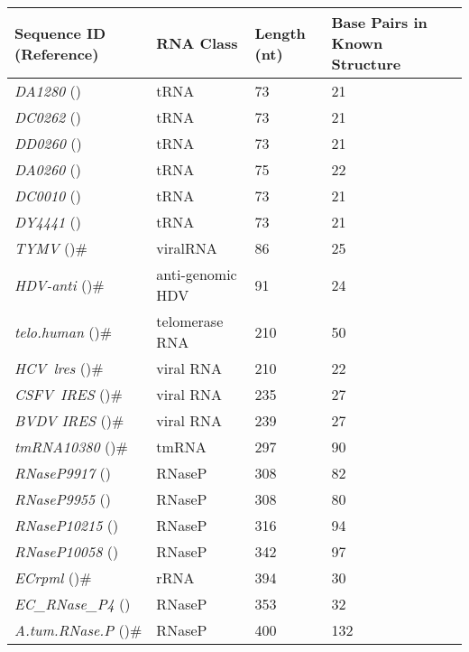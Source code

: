 \documentclass{doublecol-new}
\theoremstyle{TH}{
\newtheorem{lemma}{Lemma}
\newtheorem{theorem}[lemma]{Theorem}
\newtheorem{corrolary}[lemma]{Corrolary}
\newtheorem{conjecture}[lemma]{Conjecture}
\newtheorem{proposition}[lemma]{Proposition}
\newtheorem{claim}[lemma]{Claim}
\newtheorem{stheorem}[lemma]{Wrong Theorem}
\newtheorem{algorithm}{Algorithm}
}
\theoremstyle{THrm}{
\newtheorem{definition}{Definition}
\newtheorem{question}{Question}
\newtheorem{remark}{Remark}
\newtheorem{scheme}{Scheme}
}
\theoremstyle{THhit}{
\newtheorem{case}{Case}[section]
}
\begin{document}
\begin{table}[h]
\begin{tabular}{p{1.1in} p{0.8in} p{0.3in} p{0.3in}}
        \hline
        \textbf{Sequence ID (Reference)}   & \textbf{RNA Class}   & \textbf{Length (nt)} & \textbf{Base Pairs in Known Structure}\\
        \hline
        \hline
        \textit{DA1280} (\cite{sprinzl_1998}) & tRNA & 73 & 21 \\
        \textit{DC0262} (\cite{sprinzl_1998}) & tRNA & 73 & 21 \\
        \textit{DD0260} (\cite{sprinzl_1998}) & tRNA & 73 & 21 \\
        \textit{DA0260} (\cite{sprinzl_1998})  & tRNA & 75 & 22\\
        \textit{DC0010} (\cite{sprinzl_1998})  & tRNA & 73 & 21\\
        \textit{DY4441} (\cite{sprinzl_1998})  & tRNA & 73 & 21\\
        \textit{TYMV} (\cite{deima_1997})\#  & viralRNA & 86 & 25\\
        \textit{HDV-anti} (\cite{ferre_1998})\#  & anti-genomic HDV & 91 & 24\\
        \hline
        \textit{telo.human} (\cite{chen_2000})\#  & telomerase RNA & 210 & 50\\
        \textit{HCV~lres} (\cite{belkum_1985})\#  & viral RNA & 210 & 22\\
        \textit{CSFV~IRES} (\cite{belkum_1985})\#  & viral RNA & 235 & 27\\
        \textit{BVDV IRES} (\cite{belkum_1985})\#  & viral RNA & 239 & 27\\
        \textit{tmRNA10380} (\cite{DBLP:journals/nar/BatenburgGP01})\#  & tmRNA & 297 & 90\\
        \textit{RNaseP9917} (\cite{brown_1997})  & RNaseP & 308 & 82\\
        \textit{RNaseP9955} (\cite{brown_1997})  & RNaseP & 308 & 80\\
        \textit{RNaseP10215} (\cite{brown_1997})  & RNaseP & 316 & 94\\
        \textit{RNaseP10058} (\cite{brown_1997})  & RNaseP & 342 & 97\\
        \textit{ECrpml} (\cite{DBLP:journals/nar/BatenburgGP01})\#  & rRNA & 394 & 30\\
        \textit{EC\_RNase\_P4} (\cite{brown_1997})  & RNaseP & 353 & 32\\
        \textit{A.tum.RNase.P} (\cite{brown_1997})\#  & RNaseP & 400 & 132\\
        \hline
\end{tabular}
\end{table}
\end{document}
